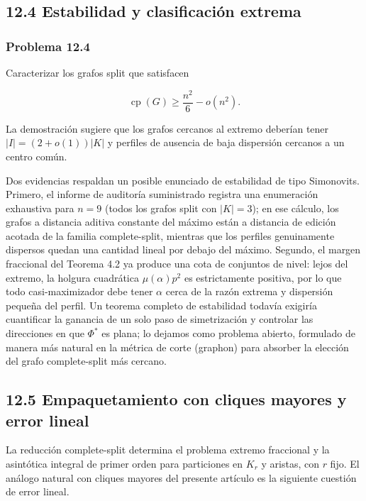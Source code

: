 \documentclass[
  spanish,
  11pt,
  a4paper,
]{article}
\begin{document}
\subsection{12.4 Estabilidad y clasificación extrema}\label{estabilidad-y-clasificaciuxf3n-extrema}

\subsubsection{Problema 12.4}\label{problema-12.4}

Caracterizar los grafos split que satisfacen

\[
\operatorname{cp}(G)
\ge
\frac{n^2}{6}-o(n^2).
\]

La demostración sugiere que los grafos cercanos al extremo deberían tener \(|I|=(2+o(1))|K|\) y perfiles de ausencia de baja dispersión cercanos a un centro común.

Dos evidencias respaldan un posible enunciado de estabilidad de tipo Simonovits. Primero, el informe de auditoría suministrado registra una enumeración exhaustiva para \(n=9\) (todos los grafos split con \(|K|=3\)); en ese cálculo, los grafos a distancia aditiva constante del máximo están a distancia de edición acotada de la familia complete-split, mientras que los perfiles genuinamente dispersos quedan una cantidad lineal por debajo del máximo. Segundo, el margen fraccional del Teorema 4.2 ya produce una cota de conjuntos de nivel: lejos del extremo, la holgura cuadrática \(\mu(\alpha)p^2\) es estrictamente positiva, por lo que todo casi-maximizador debe tener \(\alpha\) cerca de la razón extrema y dispersión pequeña del perfil. Un teorema completo de estabilidad todavía exigiría cuantificar la ganancia de un solo paso de simetrización y controlar las direcciones en que \(\Phi^*\) es plana; lo dejamos como problema abierto, formulado de manera más natural en la métrica de corte (graphon) para absorber la elección del grafo complete-split más cercano.

\subsection{12.5 Empaquetamiento con cliques mayores y error lineal}\label{empaquetamiento-con-cliques-mayores-y-error-lineal}

La reducción complete-split determina el problema extremo fraccional y la asintótica integral de primer orden para particiones en \(K_r\) y aristas, con \(r\) fijo. El análogo natural con cliques mayores del presente artículo es la siguiente cuestión de error lineal.
\end{document}
